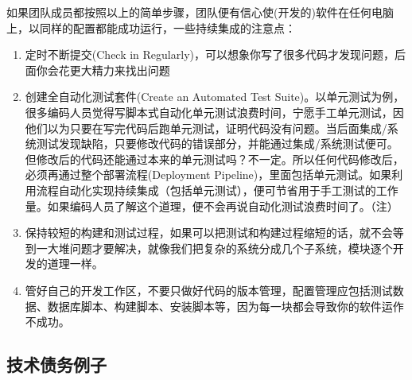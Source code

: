 如果团队成员都按照以上的简单步骤，团队便有信心使(开发的)软件在任何电脑上，以同样的配置都能成功运行，一些持续集成的注意点：

\begin{enumerate}
\tightlist
\item
  定时不断提交(Check in
  Regularly)，可以想象你写了很多代码才发现问题，后面你会花更大精力来找出问题
\item
  创建全自动化测试套件(Create an Automated Test
  Suite)。以单元测试为例，很多编码人员觉得写脚本式自动化单元测试浪费时间，宁愿手工单元测试，因他们以为只要在写完代码后跑单元测试，证明代码没有问题。当后面集成/系统测试发现缺陷，只要修改代码的错误部分，并能通过集成/系统测试便可。但修改后的代码还能通过本来的单元测试吗？不一定。所以任何代码修改后，必须再通过整个部署流程(Deployment
  Pipeline)，里面包括单元测试。如果利用流程自动化实现持续集成（包括单元测试），便可节省用于手工测试的工作量。如果编码人员了解这个道理，便不会再说自动化测试浪费时间了。（注）
\item
  保持较短的构建和测试过程，如果可以把测试和构建过程缩短的话，就不会等到一大堆问题才要解决，就像我们把复杂的系统分成几个子系统，模块逐个开发的道理一样。
\item
  管好自己的开发工作区，不要只做好代码的版本管理，配置管理应包括测试数据、数据库脚本、构建脚本、安装脚本等，因为每一块都会导致你的软件运作不成功。
\end{enumerate}

\begin{description}
\item[]
\end{description}

\hypertarget{ux6280ux672fux503aux52a1ux4f8bux5b50}{%
\subsection{技术债务例子}\label{ux6280ux672fux503aux52a1ux4f8bux5b50}}



